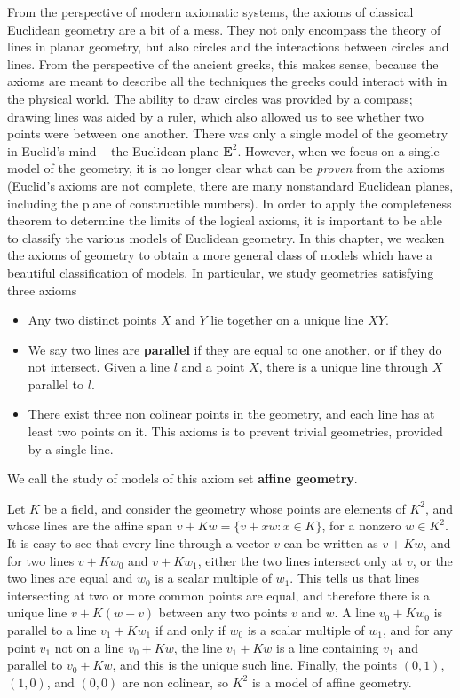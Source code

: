From the perspective of modern axiomatic systems, the axioms of classical Euclidean geometry are a bit of a mess. They not only encompass the theory of lines in planar geometry, but also circles and the interactions between circles and lines. From the perspective of the ancient greeks, this makes sense, because the axioms are meant to describe all the techniques the greeks could interact with in the physical world. The ability to draw circles was provided by a compass; drawing lines was aided by a ruler, which also allowed us to see whether two points were between one another. There was only a single model of the geometry in Euclid's mind -- the Euclidean plane $\mathbf{E}^2$. However, when we focus on a single model of the geometry, it is no longer clear what can be {\it proven} from the axioms (Euclid's axioms are not complete, there are many nonstandard Euclidean planes, including the plane of constructible numbers). In order to apply the completeness theorem to determine the limits of the logical axioms, it is important to be able to classify the various models of Euclidean geometry. In this chapter, we weaken the axioms of geometry to obtain a more general class of models which have a beautiful classification of models. In particular, we study geometries satisfying three axioms
%
\begin{itemize}
    \item Any two distinct points $X$ and $Y$ lie together on a unique line $XY$.
    \item We say two lines are {\bf parallel} if they are equal to one another, or if they do not intersect. Given a line $l$ and a point $X$, there is a unique line through $X$ parallel to $l$.
    \item There exist three non colinear points in the geometry, and each line has at least two points on it. This axioms is to prevent trivial geometries, provided by a single line.
\end{itemize}
%
We call the study of models of this axiom set {\bf affine geometry}.

\begin{example}
    Let $K$ be a field, and consider the geometry whose points are elements of $K^2$, and whose lines are the affine span $v + Kw = \{ v + xw : x \in K \}$, for a nonzero $w \in K^2$. It is easy to see that every line through a vector $v$ can be written as $v + Kw$, and for two lines $v + Kw_0$ and $v + Kw_1$, either the two lines intersect only at $v$, or the two lines are equal and $w_0$ is a scalar multiple of $w_1$. This tells us that lines intersecting at two or more common points are equal, and therefore there is a unique line $v + K(w-v)$ between any two points $v$ and $w$. A line $v_0 + Kw_0$ is parallel to a line $v_1 + Kw_1$ if and only if $w_0$ is a scalar multiple of $w_1$, and for any point $v_1$ not on a line $v_0 + Kw$, the line $v_1 + Kw$ is a line containing $v_1$ and parallel to $v_0 + Kw$, and this is the unique such line. Finally, the points $(0,1)$, $(1,0)$, and $(0,0)$ are non colinear, so $K^2$ is a model of affine geometry.
\end{example}

